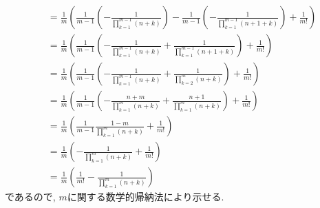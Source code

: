 \begin{proof**}
\begin{align*}
    &=
    \frac{1}{m}\left(
    \frac{1}{m-1}\left(-\frac{1}{\prod_{k=1}^{m-1}(n+k)}\right)
    -\frac{1}{m-1}\left(-\frac{1}{\prod_{k=1}^{m-1}(n+1+k)}\right)
    +\frac{1}{m!}\right)\\
    &=
    \frac{1}{m}\left(
    \frac{1}{m-1}
    \left(-\frac{1}{\prod_{k=1}^{m-1}(n+k)}
    +\frac{1}{\prod_{k=1}^{m-1}(n+1+k)}\right)
    +\frac{1}{m!}\right)\\
    &=
    \frac{1}{m}\left(
    \frac{1}{m-1}
    \left(-\frac{1}{\prod_{k=1}^{m-1}(n+k)}
    +\frac{1}{\prod_{k=2}^{m}(n+k)}\right)
    +\frac{1}{m!}\right)\\
    &=
    \frac{1}{m}\left(
    \frac{1}{m-1}
    \left(-\frac{n+m}{\prod_{k=1}^{m}(n+k)}
    +\frac{n+1}{\prod_{k=1}^{m}(n+k)}\right)
    +\frac{1}{m!}\right)\\
    &=
    \frac{1}{m}\left(
    \frac{1}{m-1}\frac{1-m}{\prod_{k=1}^{m}(n+k)}
    +\frac{1}{m!}\right)\\
    &=
    \frac{1}{m}\left(
    -\frac{1}{\prod_{k=1}^{m}(n+k)}
    +\frac{1}{m!}\right)\\
    &=
    \frac{1}{m}\left(
    \frac{1}{m!}-\frac{1}{\prod_{k=1}^{m}(n+k)}
    \right)
  \end{align*}
  であるので,
  $m$に関する数学的帰納法により示せる.
\end{proof**}

